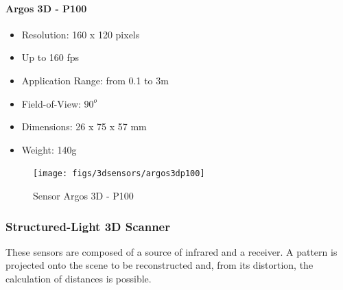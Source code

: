 \paragraph{ Argos 3D - P100}
\begin{itemize}
  \item Resolution: 160 x 120 pixels
  \item Up to 160 fps
  \item Application Range: from 0.1 to 3m%
  \item Field-of-View: $90^o$
  \item Dimensions: 26 x 75 x 57 mm
  \item Weight: 140g
\end{itemize}

\begin{figure}[h!]
   \centering
   \texttt{[image: figs/3dsensors/argos3dp100]}
   \caption{Sensor Argos 3D - P100}
   \label{fig::forecast}
\end{figure}

\subsubsection{Structured-Light 3D Scanner}

These sensors are composed of a source of infrared and a receiver.
A pattern is projected onto the scene to be reconstructed and, from its
distortion, the calculation of distances is possible.
% 



